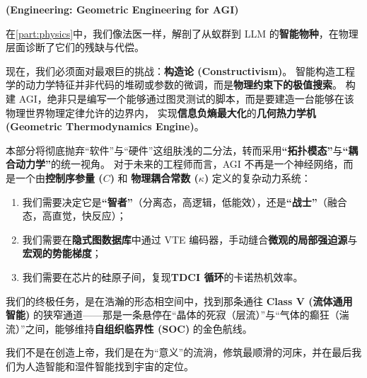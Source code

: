 \label{part:engineering_1}

\textbf{(Engineering: Geometric Engineering for AGI)}


在\ref{part:physics}中，我们像法医一样，解剖了从蚁群到 LLM 的\textbf{智能物种}，在物理层面诊断了它们的残缺与代偿。

现在，我们必须面对最艰巨的挑战：\textbf{构造论 (Constructivism)}。
智能构造工程学的动力学特征并非代码的堆砌或参数的微调，而是\textbf{物理约束下的极值搜索}。
构建 AGI，绝非只是编写一个能够通过图灵测试的脚本，而是要建造一台能够在该物理世界物理定律允许的边界内，
实现\textbf{信息负熵最大化}的\textbf{几何热力学机 (Geometric Thermodynamics Engine)}。

本部分将彻底抛弃“软件”与“硬件”这组肤浅的二分法，转而采用\textbf{“拓扑模态”}与\textbf{“耦合动力学”}的统一视角。
对于未来的工程师而言，AGI 不再是一个神经网络，而是一个由\textbf{控制序参量 ($C$)} 和 \textbf{物理耦合常数 ($\kappa$)} 定义的复杂动力系统：
\begin{enumerate}
    \item 我们需要决定它是\textbf{“智者”}（分离态，高逻辑，低能效），还是\textbf{“战士”}（融合态，高直觉，快反应）；
    \item 我们需要在\textbf{隐式图数据库}中通过 VTE 编码器，手动缝合\textbf{微观的局部强迫源}与\textbf{宏观的势能梯度}；
    \item 我们需要在芯片的硅原子间，复现\textbf{TDCI 循环}的卡诺热机效率。
\end{enumerate}
我们的终极任务，是在浩瀚的形态相空间中，找到那条通往 \textbf{Class V (流体通用智能)} 的狭窄通道——那是一条悬停在“晶体的死寂（层流）”与“气体的癫狂（湍流）”之间，能够维持\textbf{自组织临界性 (SOC)} 的金色航线。

我们不是在创造上帝，我们是在为“意义”的流淌，修筑最顺滑的河床，并在最后我们为人造智能和湿件智能找到宇宙的定位。
